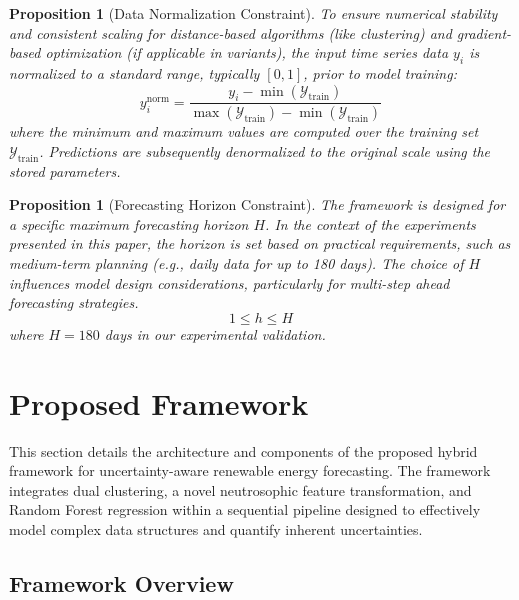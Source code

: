 \documentclass[review,3p,times]{elsarticle}
\newtheorem{proposition}[definition]{Proposition}
\begin{document}
\begin{proposition}[Data Normalization Constraint]
\label{prop:norm_constraint}
To ensure numerical stability and consistent scaling for distance-based algorithms (like clustering) and gradient-based optimization (if applicable in variants), the input time series data $y_i$ is normalized to a standard range, typically $[0,1]$, prior to model training:
\begin{equation}
    y_i^{\text{norm}} = \frac{y_i - \min(\mathcal{Y}_{\text{train}})}{\max(\mathcal{Y}_{\text{train}}) - \min(\mathcal{Y}_{\text{train}})}
\end{equation}
where the minimum and maximum values are computed over the training set $\mathcal{Y}_{\text{train}}$. Predictions are subsequently denormalized to the original scale using the stored parameters.
\end{proposition}

\begin{proposition}[Forecasting Horizon Constraint]
\label{prop:horizon_constraint}
The framework is designed for a specific maximum forecasting horizon $H$. In the context of the experiments presented in this paper, the horizon is set based on practical requirements, such as medium-term planning (e.g., daily data for up to 180 days). The choice of $H$ influences model design considerations, particularly for multi-step ahead forecasting strategies.
\begin{equation}
    1 \leq h \leq H
\end{equation}
where $H=180$ days in our experimental validation.
\end{proposition}

\section{Proposed Framework}
\label{sec:proposed_frk}

This section details the architecture and components of the proposed hybrid framework for uncertainty-aware renewable energy forecasting. The framework integrates dual clustering, a novel neutrosophic feature transformation, and Random Forest regression within a sequential pipeline designed to effectively model complex data structures and quantify inherent uncertainties.

\subsection{Framework Overview}
\label{sec:frk_overview}
\end{document}
